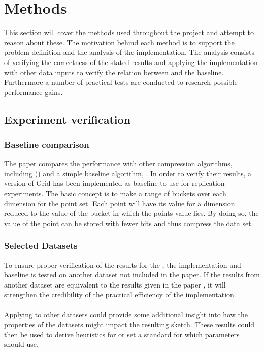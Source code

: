 \section{Methods}
\label{methods}
This section will cover the methods used throughout the project and attempt to reason about these. The motivation behind each method is to support the problem definition and the analysis of the \qs{} implementation. The analysis consists of verifying the correctness of the stated results and applying the implementation with other data inputs to verify the relation between \qs{} and the baseline. Furthermore a number of practical tests are conducted to research possible performance gains.

\subsection{Experiment verification}

\subsubsection{Baseline comparison}
The paper compares the \qs{} performance with other compression algorithms, including (\pq{}) and a simple baseline algorithm, \gr{}. In order to verify their results, a version of Grid has been implemented as baseline to use for replication experiments. The basic concept is to make a range of buckets over each dimension for the point set. Each point will have its value for a dimension reduced to the value of the bucket in which the points value lies. By doing so, the value of the point can be stored with fewer bits and thus compress the data set.

\subsubsection{Selected Datasets}
To ensure proper verification of the results for the \qs{}, the implementation and baseline is tested on another dataset not included in the paper. If the results from another dataset are equivalent to the results given in the paper \cite{wagner17}, it will strengthen the credibility of the practical efficiency of the \qs{} implementation.
\\
\\
Applying \qs{} to other datasets could provide some additional insight into how the properties of the datasets might impact the resulting sketch. These results could then be used to derive heuristics for \qs{} or set a standard for which parameters \qs{} should use.

